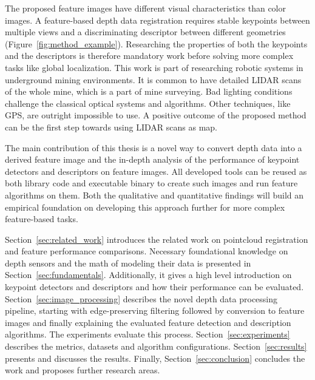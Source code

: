 The proposed feature images have different visual characteristics than color images.
A \gls{feature}-based depth data registration requires stable keypoints between multiple views and a discriminating descriptor between different geometries (Figure~\ref{fig:method_example}).
Researching the properties of both the keypoints and the descriptors is therefore mandatory work before solving more complex tasks like global localization.
This work is part of researching robotic systems in underground mining environments.
It is common to have detailed \acrshort{LIDAR} scans of the whole mine, which is a part of mine surveying.
Bad lighting conditions challenge the classical optical systems and algorithms.
Other techniques, like GPS, are outright impossible to use.
A positive outcome of the proposed method can be the first step towards using \acrshort{LIDAR} scans as map.

The main contribution of this thesis is a novel way to convert depth data into a derived feature image and the in-depth analysis of the performance of keypoint detectors and descriptors on feature images.
All developed tools can be reused as both library code and executable binary to create such images and run \gls{feature} algorithms on them.
Both the qualitative and quantitative findings will build an empirical foundation on developing this approach further for more complex feature-based tasks.

Section~\ref{sec:related_work} introduces the related work on pointcloud registration and \gls{feature} performance comparisons.
Necessary foundational knowledge on depth sensors and the math of modeling their data is presented in Section~\ref{sec:fundamentals}.
Additionally, it gives a high level introduction on keypoint detectors and descriptors and how their performance can be evaluated.
Section~\ref{sec:image_processing} describes the novel depth data processing pipeline, starting with edge-preserving filtering followed by conversion to feature images and finally explaining the evaluated \gls{feature} detection and description algorithms.
The experiments evaluate this process.
Section~\ref{sec:experiments} describes the metrics, datasets and algorithm configurations.
Section~\ref{sec:results} presents and discusses the results.
Finally, Section~\ref{sec:conclusion} concludes the work and proposes further research areas.
